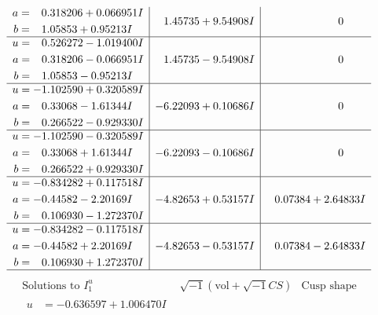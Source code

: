\documentclass[1p]{elsarticle_modified}
\theoremstyle{definition}
\newcommand{\I}{\sqrt{-1}}
\begin{document}
$$\begin{array}{c|c|c}
\begin{aligned}
a &= \phantom{-}0.318206 + 0.066951 I \\
b &= \phantom{-}1.05853 + 0.95213 I\end{aligned}
 & \phantom{-}1.45735 + 9.54908 I & \phantom{-0.000000 } 0 \\ \hline\begin{aligned}
u &= \phantom{-}0.526272 - 1.019400 I \\
a &= \phantom{-}0.318206 - 0.066951 I \\
b &= \phantom{-}1.05853 - 0.95213 I\end{aligned}
 & \phantom{-}1.45735 - 9.54908 I & \phantom{-0.000000 } 0 \\ \hline\begin{aligned}
u &= -1.102590 + 0.320589 I \\
a &= \phantom{-}0.33068 - 1.61344 I \\
b &= \phantom{-}0.266522 - 0.929330 I\end{aligned}
 & -6.22093 + 0.10686 I & \phantom{-0.000000 } 0 \\ \hline\begin{aligned}
u &= -1.102590 - 0.320589 I \\
a &= \phantom{-}0.33068 + 1.61344 I \\
b &= \phantom{-}0.266522 + 0.929330 I\end{aligned}
 & -6.22093 - 0.10686 I & \phantom{-0.000000 } 0 \\ \hline\begin{aligned}
u &= -0.834282 + 0.117518 I \\
a &= -0.44582 - 2.20169 I \\
b &= \phantom{-}0.106930 - 1.272370 I\end{aligned}
 & -4.82653 + 0.53157 I & \phantom{-}0.07384 + 2.64833 I \\ \hline\begin{aligned}
u &= -0.834282 - 0.117518 I \\
a &= -0.44582 + 2.20169 I \\
b &= \phantom{-}0.106930 + 1.272370 I\end{aligned}
 & -4.82653 - 0.53157 I & \phantom{-}0.07384 - 2.64833 I\\
 \hline 
 \end{array}$$\newpage$$\begin{array}{c|c|c}  
\text{Solutions to }I^u_{1}& \I (\text{vol} + \sqrt{-1}CS) & \text{Cusp shape}\\
 \hline 
\begin{aligned}
u &= -0.636597 + 1.006470 I \\

\end{aligned}
\end{array}$$
\end{document}
